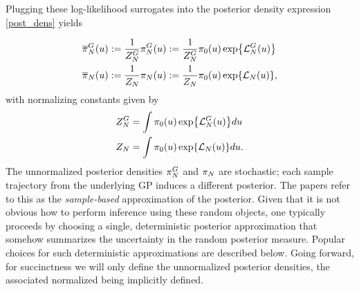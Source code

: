 \documentclass[12pt]{article}
\begin{document}
Plugging these log-likelihood surrogates into the posterior density expression \ref{post_dens} yields 

\begin{align}
\fwdEmRdm[\Ndesign]{\postDensNorm}(\Par) 
&:= \frac{1}{\fwdEmRdm[\Ndesign]{\normCst}} \fwdEmRdmDens[\Ndesign](\Par) 
:=  \frac{1}{\fwdEmRdm[\Ndesign]{\normCst}} \priorDens(\Par) \Exp{\llikEmFwd[\Ndesign](\Par)} \label{post_dens_random_fwd} \\
\llikEmRdm[\Ndesign]{\postDensNorm}(\Par) 
&:= \frac{1}{\llikEmRdm[\Ndesign]{\normCst}} \llikEmRdmDens[\Ndesign](\Par) 
:=  \frac{1}{\llikEmRdm[\Ndesign]{\normCst}} \priorDens(\Par) \Exp{\llikEm[\Ndesign](\Par)} \label{post_dens_random_llik},
\end{align}
with normalizing constants given by 
\begin{align}
\fwdEmRdm[\Ndesign]{\normCst}
&= \int \priorDens(\Par) \Exp{\llikEmFwd[\Ndesign](\Par)} d\Par \label{norm_cst_random_fwd} \\
\llikEmRdm[\Ndesign]{\normCst}
&= \int \priorDens(\Par) \Exp{\llikEm[\Ndesign](\Par)} d\Par \label{norm_cst_random_llik}. 
\end{align}
The unnormalized posterior densities $\fwdEmRdmDens[\Ndesign]$ and $\llikEmRdmDens[\Ndesign]$ are stochastic; 
each sample trajectory from the underlying GP induces a different posterior. 
The papers \cite{StuartTeck1, StuartTeck2} refer to this as the \textit{sample-based}
approximation of the posterior. Given that it is not obvious how to perform inference using these random objects, one typically 
proceeds by choosing a single, deterministic posterior approximation that somehow summarizes the uncertainty in the 
random posterior measure. Popular choices for such deterministic approximations are described below. Going forward, 
for succinctness we will only define the unnormalized posterior densities, the associated normalized being 
implicitly defined. 
\end{document}
